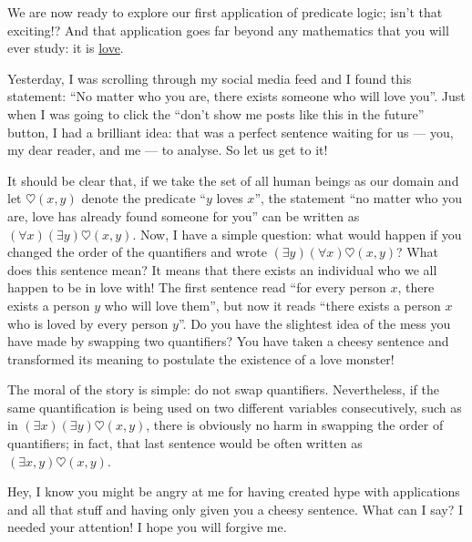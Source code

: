 \begin{para}
We are now ready to explore our first application of predicate logic; isn't that exciting!?
And that application goes far beyond any mathematics that you will ever study: it is \href{https://www.youtube.com/watch?v=-mLpe7KUg9U}{love}.

Yesterday, I was scrolling through my social media feed and I found this statement: ``No matter who you are, there exists someone who will love you''.
Just when I was going to click the ``don't show me posts like this in the future'' button, I had a brilliant idea: that was a perfect sentence waiting for us --- you, my dear reader, and me --- to analyse. So let us get to it!

It should be clear that, if we take the set of all human beings as our domain and let $\heartsuit(x,y)$ denote the predicate ``$y$ loves $x$'', the statement ``no matter who you are, love has already found someone for you'' can be written as $(\forall x)(\exists y) \heartsuit(x,y)$.
Now, I have a simple question: what would happen if you changed the order of the quantifiers and wrote $(\exists y)(\forall x)\heartsuit(x,y)$?
What does this sentence mean?
It means that there exists an individual who we all happen to be in love with!
The first sentence read ``for every person $x$, there exists a person $y$ who will love them'', but now it reads ``there exists a person $x$ who is loved by every person $y$''.
Do you have the slightest idea of the mess you have made by swapping two quantifiers? You have taken a cheesy sentence and transformed its meaning to postulate the existence of a love monster!

The moral of the story is simple: do not swap quantifiers.
Nevertheless, if the same quantification is being used on two different variables consecutively, such as in $(\exists x)(\exists y)\heartsuit(x,y)$, there is obviously no harm in swapping the order of quantifiers; in fact, that last sentence would be often written as $(\exists x,y)\heartsuit(x,y)$.

Hey, I know you might be angry at me for having created hype with applications and all that stuff and having only given you a cheesy sentence. What can I say? I needed your attention! I hope you will forgive me.
\end{para}


